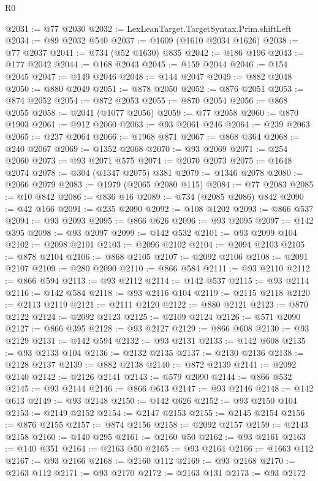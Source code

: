 \begin{lexlean}{R0}
\begin{coremodule}
@2031 := @77 @2030
@2032 := LexLeanTarget.TargetSyntax.Prim.shiftLeft
@2034 := @89 @2032 @540
@2037 := @1609 (@1610 @2034 @1626)
@2038 := @77 @2037
@2041 := @734 (@52 @1630) @835
@2042 := @186 @196
@2043 := @177 @2042
@2044 := @168 @2043
@2045 := @159 @2044
@2046 := @154 @2045
@2047 := @149 @2046
@2048 := @144 @2047
@2049 := @882 @2048
@2050 := @880 @2049
@2051 := @878 @2050
@2052 := @876 @2051
@2053 := @874 @2052
@2054 := @872 @2053
@2055 := @870 @2054
@2056 := @868 @2055
@2058 := @2041 (@1077 @2056)
@2059 := @77 @2058
@2060 := @870 @1903
@2061 := @912 @2060
@2063 := @93 @2061 @246
@2064 := @239 @2063
@2065 := @237 @2064
@2066 := @1968 @871
@2067 := @868 @364
@2068 := @240 @2067
@2069 := @1352 @2068
@2070 := @93 @2069
@2071 := @254 @2060
@2073 := @93 @2071 @575
@2074 := @2070 @2073
@2075 := @1648 @2074
@2078 := @304 (@1347 @2075) @381
@2079 := @1346 @2078
@2080 := @2066 @2079
@2083 := @1979 (@2065 @2080 @115)
@2084 := @77 @2083
@2085 := @10 @842
@2086 := @836 @16
@2089 := @734 (@2085 @2086) @842
@2090 := @42 @166
@2091 := @235 @2090
@2092 := @108 @1202
@2093 := @866 @537
@2094 := @93 @2093
@2095 := @866 @626
@2096 := @93 @2095
@2097 := @142 @395
@2098 := @93 @2097
@2099 := @142 @532
@2101 := @93 @2099 @104
@2102 := @2098 @2101
@2103 := @2096 @2102
@2104 := @2094 @2103
@2105 := @878 @2104
@2106 := @868 @2105
@2107 := @2092 @2106
@2108 := @2091 @2107
@2109 := @280 @2090
@2110 := @866 @584
@2111 := @93 @2110
@2112 := @866 @594
@2113 := @93 @2112
@2114 := @142 @537
@2115 := @93 @2114
@2116 := @142 @584
@2118 := @93 @2116 @104
@2119 := @2115 @2118
@2120 := @2113 @2119
@2121 := @2111 @2120
@2122 := @880 @2121
@2123 := @870 @2122
@2124 := @2092 @2123
@2125 := @2109 @2124
@2126 := @571 @2090
@2127 := @866 @395
@2128 := @93 @2127
@2129 := @866 @608
@2130 := @93 @2129
@2131 := @142 @594
@2132 := @93 @2131
@2133 := @142 @608
@2135 := @93 @2133 @104
@2136 := @2132 @2135
@2137 := @2130 @2136
@2138 := @2128 @2137
@2139 := @882 @2138
@2140 := @872 @2139
@2141 := @2092 @2140
@2142 := @2126 @2141
@2143 := @579 @2090
@2144 := @866 @532
@2145 := @93 @2144
@2146 := @866 @613
@2147 := @93 @2146
@2148 := @142 @613
@2149 := @93 @2148
@2150 := @142 @626
@2152 := @93 @2150 @104
@2153 := @2149 @2152
@2154 := @2147 @2153
@2155 := @2145 @2154
@2156 := @876 @2155
@2157 := @874 @2156
@2158 := @2092 @2157
@2159 := @2143 @2158
@2160 := @140 @295
@2161 := @2160 @50
@2162 := @93 @2161
@2163 := @140 @351
@2164 := @2163 @50
@2165 := @93 @2164
@2166 := @1663 @112
@2167 := @93 @2166
@2168 := @2160 @112
@2169 := @93 @2168
@2170 := @2163 @112
@2171 := @93 @2170
@2172 := @2163 @131
@2173 := @93 @2172

\end{coremodule}
\end{lexlean}
